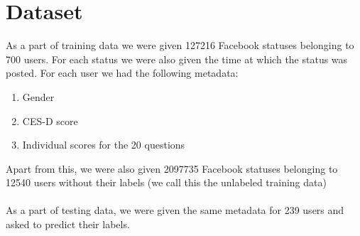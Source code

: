 \section{Dataset}
\label{sec:dataset}
As a part of training data we were given 127216 Facebook statuses belonging to 700 users. For each status we were also given the time at which the status was posted. For each user we had the following metadata:
\begin{enumerate}
\item Gender
\item CES-D score
\item Individual scores for the 20 questions
\end{enumerate}
Apart from this, we were also given  2097735 Facebook statuses belonging to 12540 users without their labels (we call this the unlabeled training data)\\\\
As a part of testing data, we were given the same metadata for 239 users and asked to predict their labels.